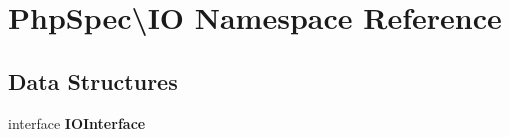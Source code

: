 \section{Php\+Spec\textbackslash{}I\+O Namespace Reference}
\label{namespace_php_spec_1_1_i_o}
\subsection*{Data Structures}
\begin{DoxyCompactItemize}
\item 
interface {\bf I\+O\+Interface}
\end{DoxyCompactItemize}
